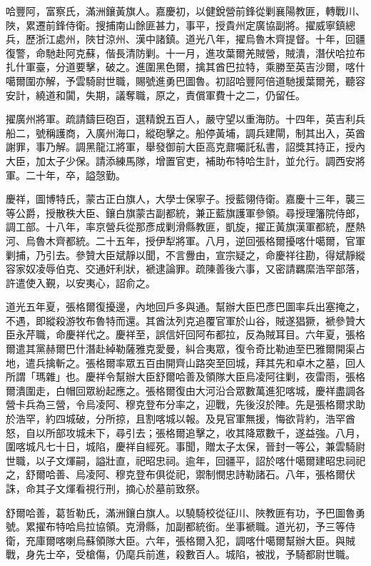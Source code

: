 \begin{pinyinscope}
哈豐阿，富察氏，滿洲鑲黃旗人。嘉慶初，以健銳營前鋒從剿襄陽教匪，轉戰川、陜，累遷前鋒侍衛。搜捕南山餘匪甚力，事平，授貴州定廣協副將。擢威寧鎮總兵，歷浙江處州，陜甘涼州、漢中諸鎮。道光八年，擢烏魯木齊提督。十年，回疆復警，命馳赴阿克蘇，偕長清防剿。十一月，進攻葉爾羌賊營，賊潰，潛伏哈拉布扎什軍臺，分道要擊，破之。進圍黑色爾，擒其酋巴拉特，乘勝至英吉沙爾，喀什噶爾圍亦解，予雲騎尉世職，賜號進勇巴圖魯。初詔哈豐阿倍道馳援葉爾羌，聽容安計，繞道和闐，失期，議奪職，原之，責償軍費十之二，仍留任。

擢廣州將軍。疏請鑄巨砲百，選精銳五百人，嚴守望以重海防。十四年，英吉利兵船二，號稱護商，入廣州海口，縱砲擊之。船停黃埔，調兵建閘，制其出入，英酋謝罪，事乃解。調黑龍江將軍，舉發御前大臣高克鼐囑託私書，詔獎其持正，授內大臣，加太子少保。請添練馬隊，增置官吏，補助布特哈生計，並允行。調西安將軍。二十年，卒，謚愨勤。

慶祥，圖博特氏，蒙古正白旗人，大學士保寧子。授藍翎侍衛。嘉慶十三年，襲三等公爵，授散秩大臣、鑲白旗蒙古副都統，兼正藍旗護軍參領。尋授理籓院侍郎，調工部。十八年，率京營兵從那彥成剿滑縣教匪，凱旋，擢正黃旗漢軍都統，歷熱河、烏魯木齊都統。二十五年，授伊犁將軍。八月，逆回張格爾擾喀什噶爾，官軍剿捕，乃引去。參贊大臣斌靜以聞，不言釁由，宣宗疑之，命慶祥往勘，得斌靜縱容家奴凌辱伯克、交通奸利狀，褫逮論罪。疏陳善後六事，又密請羈縻浩罕部落，許遣使入覲，以安夷心，詔俞之。

道光五年夏，張格爾復擾邊，內地回戶多與通。幫辦大臣巴彥巴圖率兵出塞掩之，不遇，即縱殺游牧布魯特而還。其酋汰列克追覆官軍於山谷，賊遂猖獗，褫參贊大臣永芹職，命慶祥代之。慶祥至，誤信奸回阿布都拉，反為賊耳目。六年夏，張格爾遣其黨赫爾巴什潛赴綽勒薩雅克愛曼，糾合夷眾，復令奇比勒迪至巴雅爾開渠占地，遣兵擒斬之。張格爾率眾五百由開齊山路突至回城，拜其先和卓木之墓，回人所謂「瑪雜」也。慶祥令幫辦大臣舒爾哈善及領隊大臣烏凌阿往剿，夜雷雨，張格爾潰圍走，白帽回眾紛起應之。張格爾復由大河沿合眾數萬進犯喀城，慶祥盡調各營卡兵為三營，令烏凌阿、穆克登布分率之，迎戰，先後沒於陣。先是張格爾求助於浩罕，約四城破，分所掠，且割喀城以報。及見官軍無援，悔欲背約，浩罕酋怒，自以所部攻城未下，尋引去；張格爾追擊之，收其降眾數千，遂益強。八月，圍喀城凡七十日，城陷，慶祥自經死。事聞，贈太子太保，晉封一等公，兼雲騎尉世職，以子文煇嗣，謚壯直，祀昭忠祠。逾年，回疆平，詔於喀什噶爾建昭忠祠祀之，舒爾哈善、烏凌阿、穆克登布俱從祀，禦制憫忠詩勒諸石。八年，張格爾伏誅，命其子文煇看視行刑，摘心於墓前致祭。

舒爾哈善，葛哲勒氏，滿洲鑲白旗人。以驍騎校從征川、陜教匪有功，予巴圖魯勇號。累擢布特哈烏拉協領。克滑縣，加副都統銜。坐事褫職。道光初，予三等侍衛，充庫爾喀喇烏蘇領隊大臣。六年，張格爾入犯，調喀什噶爾幫辦大臣。與賊戰，身先士卒，受槍傷，仍麾兵前進，殺數百人。城陷，被戕，予騎都尉世職。


\end{pinyinscope}
